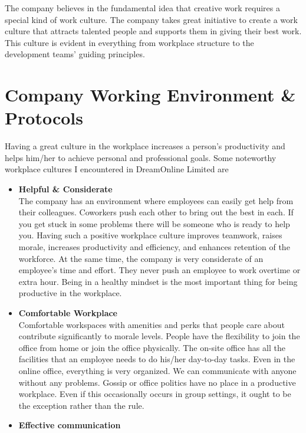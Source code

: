 \setcounter{section}{0} 
The company believes in the fundamental idea that creative work requires a special kind of work
culture. The company takes great initiative to create a work culture that attracts talented people
and supports them in giving their best work. This culture is evident in everything from workplace
structure to the development teams' guiding principles.

\section{Company Working Environment \& Protocols}
\begin{flushleft}
Having a great culture in the workplace increases a person’s productivity and helps him/her to
achieve personal and professional goals.
Some noteworthy workplace cultures I encountered in DreamOnline Limited are 
\begin{itemize}
    \item \textbf{Helpful \& Considerate}\\
    \vspace{6pt}
The company has an environment where employees can easily get help from their
colleagues. Coworkers push each other to bring out the best in each. If you get stuck in
some problems there will be someone who is ready to help you. Having such a positive
workplace culture improves teamwork, raises morale, increases productivity and
efficiency, and enhances retention of the workforce.
At the same time, the company is very considerate of an employee's time and effort.
They never push an employee to work overtime or extra hour. Being in a healthy mindset
is the most important thing for being productive in the workplace.
    \item \textbf{ Comfortable Workplace}\\
    \vspace{6pt}
Comfortable workspaces with amenities and perks that people care about contribute
significantly to morale levels. People have the flexibility to join the office from home or
join the office physically. The on-site office has all the facilities that an employee needs
to do his/her day-to-day tasks. Even in the online office, everything is very organized.
We can communicate with anyone without any problems. Gossip or office politics have
no place in a productive workplace. Even if this occasionally occurs in group settings, it
ought to be the exception rather than the rule.
\item \textbf{ Effective communication}
\vspace{6pt}

\end{itemize}
\end{flushleft}
